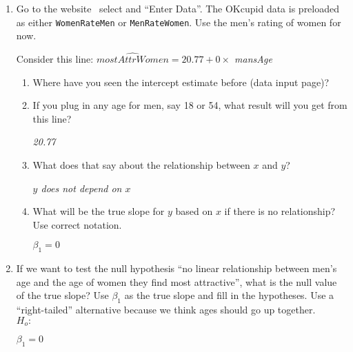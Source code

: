 \begin{enumerate}
\item Go to the website
  \webAppURLFrst \ 
  select  and ``Enter Data''. The OKcupid data is
  preloaded as either {\tt WomenRateMen} or {\tt MenRateWomen}. Use
  the men's rating of women for now.

Consider this line:
  {\it  $\widehat{mostAttrWomen} = 20.77 + 0 \times $ mansAge   }


    \begin{enumerate} 
    \item Where have you seen the intercept estimate before (data
      input page)?

      \item If you plug in any age for men, say 18 or 54, what result
        will you get from this line?
\begin{students}
 \vspace{1.cm}      
\end{students}

\begin{key}
  {\it   20.77    }
\end{key}
      \item What does that say about the relationship between $x$ and
        $y$?
\begin{students}
 \vspace{1.cm}      
\end{students}

\begin{key}
  {\it  $y$ does not depend on $x$  }
\end{key}

      \item What will be the true slope for $y$ based on $x$ if there
        is no relationship?  Use    correct notation.
\begin{students}
 \vspace{1cm}      
\end{students}

\begin{key}
  {\it  $\beta_1=0$   }
\end{key}
      \end{enumerate}
      

\item  If we  want to test the null hypothesis ``no linear
  relationship between men's age and the age of women they find most
  attractive'', what is the null value of the true slope?  Use $\beta_1$ as the
  true slope and fill in the hypotheses.  Use a ``right-tailed''
  alternative because we think ages should go up together.\\
  $H_o:$
\begin{students}
 \vspace{1cm}      
\end{students}
\begin{key}
  {\it  $\beta_1 = 0$   }
\end{key}


\end{enumerate}
